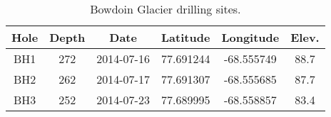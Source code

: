 \documentclass[utf8]{article}
\begin{document}
\clearpage

    \begin{table}[t]
      \caption{%
        Bowdoin Glacier drilling sites.}
      \label{tab:drilling}
      {\begin{tabular}{cccccc}
        \hline
        Hole & Depth & Date       & Latitude  & Longitude  & Elev. \\
        \hline
        BH1  & 272   & 2014-07-16 & 77.691244 & -68.555749 & 88.7 \\ %
        BH2  & 262   & 2014-07-17 & 77.691307 & -68.555685 & 87.7 \\ %
        BH3  & 252   & 2014-07-23 & 77.689995 & -68.558857 & 83.4 \\ %
        \hline
      \end{tabular}}
    \end{table}
\end{document}
